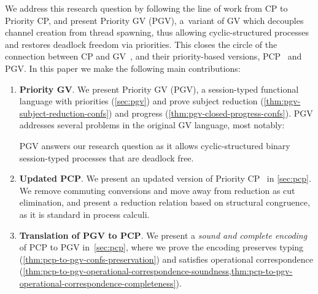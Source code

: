 \documentclass[main.tex]{subfiles}
\begin{document}
We address this research question by following the line of work from CP to Priority CP, and present
Priority GV (PGV), a~variant of GV which decouples channel creation from thread spawning, thus allowing cyclic-structured processes and restores deadlock freedom via priorities. This closes the circle of the connection between CP and GV~\cite{wadler14}, and their priority-based versions, PCP~\cite{dardhagay18} and PGV.
%
In this paper we make the following main contributions:
\begin{enumerate}
	\item \textbf{Priority GV}. We present Priority GV (PGV), a session-typed functional language with priorities (\cref{sec:pgv}) and prove subject reduction (\cref{thm:pgv-subject-reduction-confs}) and progress (\cref{thm:pgv-closed-progress-confs}).
	PGV addresses several problems in the original GV language, most notably:
	PGV answers our research question as it allows cyclic-structured binary session-typed processes that are deadlock free.
	\item \textbf{Updated PCP}. We present an updated version of Priority CP~\cite{dardhagay18} in \cref{sec:pcp}. We remove commuting conversions and move away from reduction as cut elimination, and present a reduction relation based on structural congruence, as it is standard in process calculi.
	\item \textbf{Translation of PGV to PCP}. We present a \emph{sound and complete encoding} of PCP to PGV in~\cref{sec:pcp}, where we prove the encoding preserves typing (\cref{thm:pcp-to-pgv-confs-preservation}) and satisfies operational correspondence (\cref{thm:pcp-to-pgv-operational-correspondence-soundness,thm:pcp-to-pgv-operational-correspondence-completeness}).
\end{enumerate}
\end{document}
